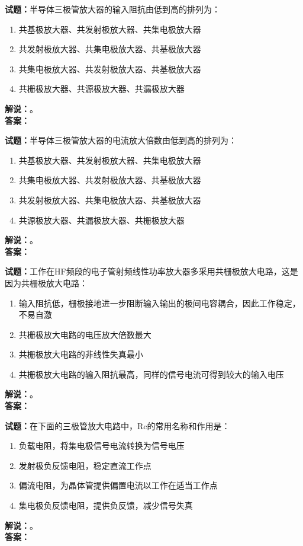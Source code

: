 \documentclass{ctexbook}
\begin{document}
\bigskip




\noindent\textbf{试题：}半导体三极管放大器的输入阻抗由低到高的排列为：
\begin{enumerate}[leftmargin=3em]
\item 共基极放大器、共发射极放大器、共集电极放大器
\item 共发射极放大器、共集电极放大器、共基极放大器
\item 共集电极放大器、共发射极放大器、共基极放大器
\item 共栅极放大器、共源极放大器、共漏极放大器
\end{enumerate}
\noindent\textbf{解说：}\textbf{}。\\\noindent\textbf{答案：}

\bigskip




\noindent\textbf{试题：}半导体三极管放大器的电流放大倍数由低到高的排列为：
\begin{enumerate}[leftmargin=3em]
\item 共基极放大器、共发射极放大器、共集电极放大器
\item 共集电极放大器、共发射极放大器、共基极放大器
\item 共发射极放大器、共集电极放大器、共基极放大器
\item 共源极放大器、共漏极放大器、共栅极放大器
\end{enumerate}
\noindent\textbf{解说：}\textbf{}。\\\noindent\textbf{答案：}

\bigskip




\noindent\textbf{试题：}工作在HF频段的电子管射频线性功率放大器多采用共栅极放大电路，这是因为共栅极放大电路： 
\begin{enumerate}[leftmargin=3em]
\item 输入阻抗低，栅极接地进一步阻断输入输出的极间电容耦合，因此工作稳定，不易自激 
\item 共栅极放大电路的电压放大倍数最大
\item 共栅极放大电路的非线性失真最小
\item 共栅极放大电路的输入阻抗最高，同样的信号电流可得到较大的输入电压
\end{enumerate}
\noindent\textbf{解说：}\textbf{}。\\\noindent\textbf{答案：}

\bigskip




\noindent\textbf{试题：}在下面的三极管放大电路中，Rc的常用名称和作用是：
\begin{enumerate}[leftmargin=3em]
\item 负载电阻，将集电极信号电流转换为信号电压
\item 发射极负反馈电阻，稳定直流工作点
\item 偏流电阻，为晶体管提供偏置电流以工作在适当工作点
\item 集电极负反馈电阻，提供负反馈，减少信号失真
\end{enumerate}
\noindent\textbf{解说：}\textbf{}。\\\noindent\textbf{答案：}
\end{document}
